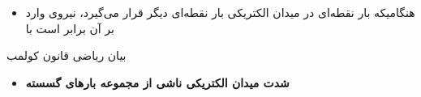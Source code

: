 \begin{ELimportant}{}


\end{ELimportant}

\begin{ELjoin}

\begin{itemize}
\tightlist
\item
  هنگامیکه بار نقطه‌ای  در میدان الکتریکی بار نقطه‌ای دیگر  قرار می‌گیرد، نیروی وارد بر آن برابر است با
\end{itemize}

\begin{ELimportant}{بیان ریاضی قانون کولمب}


\end{ELimportant}

\end{ELjoin}

\begin{ELunit}


\end{ELunit}

\begin{ELjoin}

\begin{itemize}
\tightlist
\item
  \textbf{شدت میدان الکتریکی ناشی از مجموعه بارهای گسسته}
\end{itemize}

\begin{ELimportant}{}


\end{ELimportant}

\end{ELjoin}

